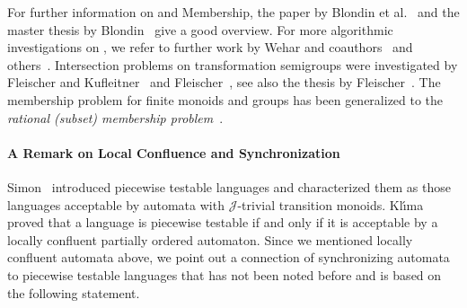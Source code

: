 For further information on \DFAINT and {\sc Membership},
the paper by Blondin et al.~\cite{BlondinKM16} and the master thesis by Blondin~\cite{Blondin2012msthesis}
give a good overview. For more algorithmic investigations on \DFAINT,
we refer to further work by Wehar and coauthors~\cite{DBLP:journals/corr/abs-2108-05244,OliveiraWehar2018,DBLP:conf/dlt/OliveiraW20,Wehar2014hardness,Wehar2016} and others~\cite{Arrighi2021,DBLP:journals/jcss/FernauHV15,FerKre2017,DBLP:journals/tcs/KarakostasLV03,DBLP:conf/mfcs/LangeR92,DBLP:conf/wia/Wareham00}.
Intersection problems on transformation semigroups 
were investigated by Fleischer and Kufleitner~\cite{DBLP:conf/stacs/FleischerK18} and Fleischer~\cite{DBLP:journals/ijfcs/Fleischer20},
see also the thesis by Fleischer~\cite{Fleischer2019thesis}.
The membership problem for finite monoids and groups 
has been generalized to the \emph{rational (subset) membership problem}~\cite{KAMBITES2007622,Lohrey2015}.



\paragraph{A Remark on Local Confluence and Synchronization} Simon~\cite{Simon1972DotDepthOne,DBLP:conf/automata/Simon75} introduced
piecewise testable languages and characterized them as those languages
acceptable by automata with $\mathcal J$-trivial transition monoids.
Kl{\'{\i}}ma~\cite[Thm.~1]{DBLP:conf/dlt/KlimaP13}
proved that a language is piecewise testable
if and only if it is acceptable by a locally confluent partially ordered automaton.
Since we mentioned locally confluent automata above, 
we point out a connection of synchronizing automata to piecewise testable languages 
that has not been noted before and is based on the following statement.

